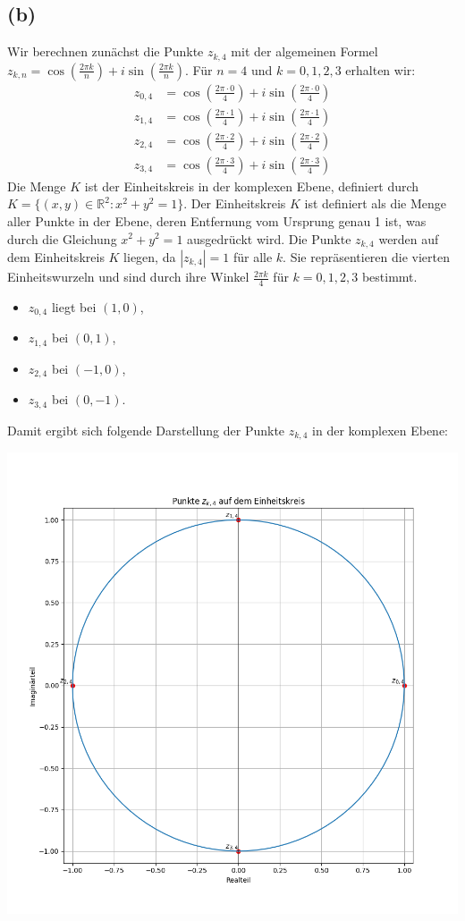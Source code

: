 \documentclass{article}
\theoremstyle{definition}
\theoremstyle{remark}
\begin{document}
\subsection*{(b)}

Wir berechnen zunächst die Punkte \( z_{k,4}\) mit der algemeinen Formel \( z_{k,n} = \cos(\frac{2 \pi k}{n}) + i \sin(\frac{2 \pi k}{n})\). Für \( n = 4 \) und \( k = 0, 1, 2, 3 \) erhalten wir:
\begin{align*}
    z_{0,4} & = \cos \left( \frac{2 \pi \cdot 0}{4} \right) + i \sin \left( \frac{2 \pi \cdot 0}{4} \right) \\
    z_{1,4} & = \cos \left( \frac{2 \pi \cdot 1}{4} \right) + i \sin \left( \frac{2 \pi \cdot 1}{4} \right) \\
    z_{2,4} & = \cos \left( \frac{2 \pi \cdot 2}{4} \right) + i \sin \left( \frac{2 \pi \cdot 2}{4} \right) \\
    z_{3,4} & = \cos \left( \frac{2 \pi \cdot 3}{4} \right) + i \sin \left( \frac{2 \pi \cdot 3}{4} \right)
\end{align*}
Die Menge \( K \) ist der Einheitskreis in der komplexen Ebene, definiert durch \( K = \{(x,y) \in \mathbb{R}^2 : x^2 + y^2 = 1\} \). Der Einheitskreis \( K \) ist definiert als die Menge aller Punkte in der Ebene, deren Entfernung vom Ursprung genau 1 ist, was durch die Gleichung \( x^2 + y^2 = 1 \) ausgedrückt wird.
Die Punkte \( z_{k,4} \) werden auf dem Einheitskreis \( K \) liegen, da \( |z_{k,4}| = 1 \) für alle \( k \). Sie repräsentieren die vierten Einheitswurzeln und sind durch ihre Winkel \( \frac{2 \pi k}{4} \) für \( k = 0, 1, 2, 3 \) bestimmt.
\begin{itemize}
    \item \( z_{0,4} \) liegt bei \( (1,0) \),
    \item \( z_{1,4} \) bei \( (0,1) \),
    \item \( z_{2,4} \) bei \( (-1,0) \),
    \item \( z_{3,4} \) bei \( (0,-1) \).
\end{itemize}
Damit ergibt sich folgende Darstellung der Punkte \( z_{k,4} \) in der komplexen Ebene:

\includegraphics[scale=0.6]{Figure_1.png}
\end{document}
